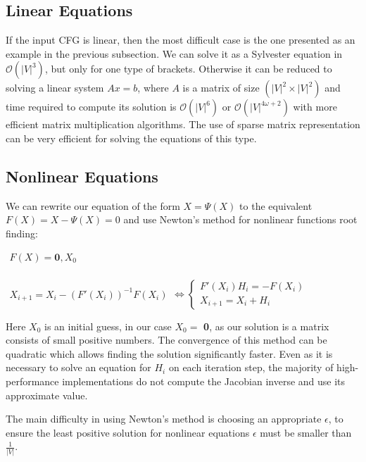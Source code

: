 \documentclass[sigconf]{acmart}
\begin{document}
\subsection{Linear Equations}

If the input CFG is linear, then the most difficult case is the one presented as an example in the previous subsection. 
We can solve it as a Sylvester equation in $\mathcal{O}(|V|^3)$, but only for one type of brackets.
Otherwise it can be reduced to solving a linear system $Ax = b$, where $A$ is a matrix of size $(|V|^2 \times |V|^2)$ and time required to compute its solution is $\mathcal{O}(|V|^6)$ or $\mathcal{O}(|V|^{4\omega + 2})$ with more efficient matrix multiplication algorithms. 
The use of sparse matrix representation can be very efficient for solving the equations of this type.

\subsection{Nonlinear Equations}

We can rewrite our equation of the form $X = \Psi(X)$ to the equivalent $F(X) = X - \Psi(X) = 0$ and use Newton's method for nonlinear functions root finding:

\begin{center}
\(
\left.
\begin{array}{c}
F(X) = \mathbf{0}, X_0 \\
\end{array} 
\right.
\)

\(
\left. 
\begin{array}{l}
X_{i+1} = X_i - (F'(X_i))^{-1}F(X_i) 
\end{array} 
\right.
\iff 
\left\{
\begin{array}{l}
F'(X_i)H_i = - F(X_i) \\
X_{i+1} = X_i + H_i
\end{array} 
\right.
\)
\end{center}

Here $X_0$ is an initial guess, in our case $X_0 = $ \textbf{0}, as our solution is a matrix consists of small positive numbers. 
The convergence of this method can be quadratic which allows finding the solution significantly faster.
Even as it is necessary to solve an equation for $H_i$ on each iteration step, the majority of high-performance implementations do not compute the Jacobian inverse and use its approximate value.

The main difficulty in using Newton's method is choosing an appropriate $\epsilon$, to ensure the least positive solution for nonlinear equations $\epsilon$ must be smaller than $\frac{1}{|V|}$.
\end{document}
